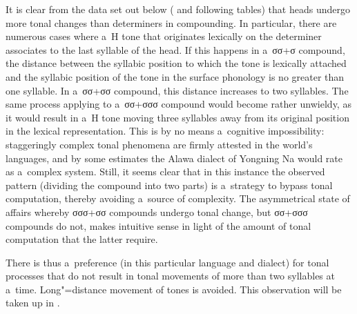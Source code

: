 It is clear from the data set out below ( and following
tables) that heads undergo more tonal changes than determiners in compounding. In particular, there
are numerous cases where a~H tone that originates lexically on the determiner associates to
the last syllable of the head. If this happens in a~σσ+σ compound, the distance between the syllabic position to which the tone is lexically attached and the syllabic position of the tone in the surface phonology is no greater than one syllable. In a~σσ+σσ compound, this distance increases to two syllables. 
The same process applying to a~σσ+σσσ compound would become rather unwieldy, as it would result in a~H tone moving three syllables away from its original position in the lexical representation. This is by no means a~cognitive impossibility: staggeringly complex tonal phenomena are firmly attested in the world's languages, and by some estimates the Alawa dialect of Yongning Na would rate as a~complex system. Still, it seems clear that in this instance the observed pattern (dividing the compound into two parts) is a~strategy to bypass tonal computation, thereby avoiding a~source of complexity. The asymmetrical state of affairs whereby σσσ+σσ compounds undergo tonal change, but σσ+σσσ compounds do not, makes intuitive sense in light of the amount of tonal computation that the latter require. 

There is thus a~preference (in this particular language and dialect) for tonal processes that do not result in tonal movements of more than two syllables at a~time. Long"=distance movement of tones is avoided. This observation will be taken up in . 


